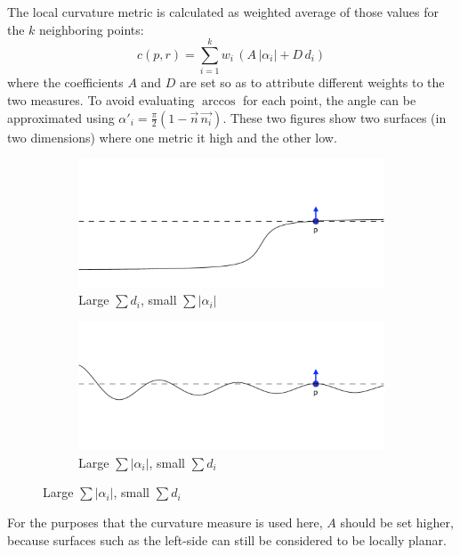 The local curvature metric is calculated as weighted average of those values for the $k$ neighboring points:
\begin{equation}
c(p, r) = \sum_{i=1}^{k} w_i \, \left( A \, |\alpha_i| + D \, d_i \right)
\end{equation}
where the coefficients $A$ and $D$ are set so as to attribute different weights to the two measures. To avoid evaluating $\arccos$ for each point, the angle can be approximated using $\alpha'_i = \frac{\pi}{2} (1 - \vec{n} \, \vec{n_i})$. These two figures show two surfaces (in two dimensions) where one metric it high and the other low.
\begin{figure}[H]
\centering
\begin{subfigure}{.4\textwidth}
	\includegraphics[width=\linewidth]{fig/curvature_distances.pdf}
	\caption{Large $\sum d_i$, small $\sum |\alpha_i|$}
\end{subfigure}%
\hspace{15mm}%
\begin{subfigure}{.4\textwidth}
	\includegraphics[width=\linewidth]{fig/curvature_angles.pdf}
	\caption{Large $\sum |\alpha_i|$, small $\sum d_i$}
\end{subfigure}	
\end{figure}
For the purposes that the curvature measure is used here, $A$ should be set higher, because surfaces such as the left-side can still be considered to be locally planar.






